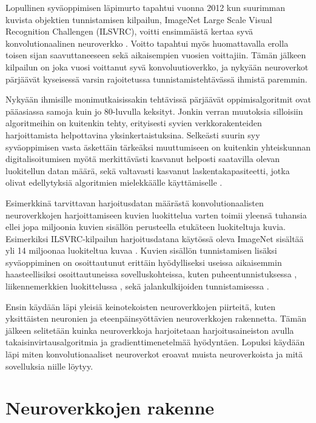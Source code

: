 \documentclass[finnish]{tktltiki2}
\theoremstyle{definition}
\theoremstyle{remark}
\begin{document}
  Lopullinen syväoppimisen läpimurto tapahtui vuonna 2012 kun suurimman kuvista objektien tunnistamisen kilpailun, ImageNet Large Scale Visual Recognition Challengen (ILSVRC), voitti ensimmäistä kertaa syvä konvolutionaalinen neuroverkko \cite{KSHimagenet2012}. Voitto tapahtui myös huomattavalla erolla toisen sijan saavuttaneeseen sekä aikaisempien vuosien voittajiin. Tämän jälkeen kilpailun on joka vuosi voittanut syvä konvoluutioverkko, ja nykyään neuroverkot pärjäävät kyseisessä varsin rajoitetussa tunnistamistehtävässä ihmistä paremmin.

  Nykyään ihmisille monimutkaisissakin tehtävissä pärjäävät oppimisalgoritmit ovat pääasiassa samoja kuin jo 80-luvulla keksityt. Jonkin verran muutoksia silloisiin algoritmeihin on kuitenkin tehty, erityisesti syvien verkkorakenteiden harjoittamista helpottavina yksinkertaistuksina. Selkeästi suurin syy syväoppimisen vasta äskettäin tärkeäksi muuttumiseen on kuitenkin yhteiskunnan digitalisoitumisen myötä merkittävästi kasvanut helposti saatavilla olevan luokitellun datan määrä, sekä valtavasti kasvanut laskentakapasiteetti, jotka olivat edellytyksiä algoritmien mielekkäälle käyttämiselle \cite{Goodfellow-et-al-2016}.

  Esimerkkinä tarvittavan harjoitusdatan määrästä konvolutionaalisten neuroverkkojen harjoittamiseen kuvien luokittelua varten toimii yleensä tuhansia ellei jopa miljoonia kuvien sisällön perusteella etukäteen luokiteltuja kuvia. Esimerkiksi ILSVRC-kilpailun harjoitusdatana käytössä oleva ImageNet sisältää yli 14 miljoonaa luokiteltua kuvaa \cite{imagenet-website}. Kuvien sisällön tunnistamisen lisäksi syväoppiminen on osoittautunut erittäin hyödylliseksi useissa aikaisemmin haasteellisiksi osoittautuneissa sovelluskohteissa, kuten puheentunnistuksessa \cite{abdel2012applying}, liikennemerkkien luokittelussa \cite{sermanet2011traffic}, sekä jalankulkijoiden tunnistamisessa \cite{szarvas2005pedestrian}.

  Ensin käydään läpi yleisiä keinotekoisten neuroverkkojen piirteitä, kuten yksittäisten neuronien ja eteenpäinsyöttävien neuroverkkojen rakennetta. Tämän jälkeen selitetään kuinka neuroverkkoja harjoitetaan harjoitusaineiston avulla takaisinvirtausalgoritmia ja gradienttimenetelmää hyödyntäen. Lopuksi käydään läpi miten konvolutionaaliset neuroverkot eroavat muista neuroverkoista ja mitä sovelluksia niille löytyy.

  \section{Neuroverkkojen rakenne}
\end{document}

